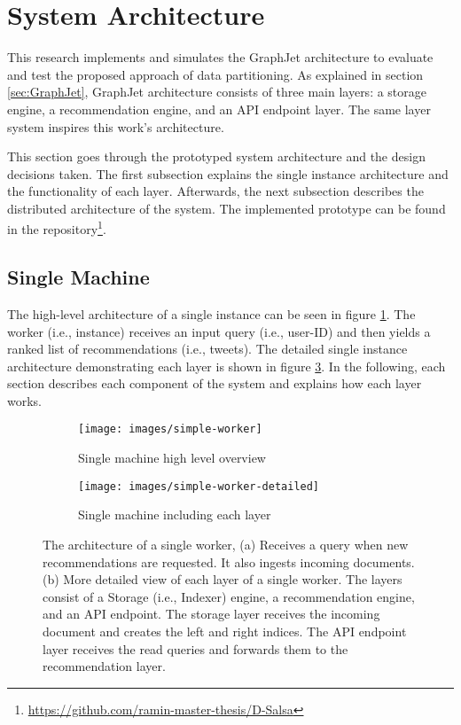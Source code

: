 \section{System Architecture}
\label{sec:system-architecture}

This research implements and simulates the GraphJet architecture to evaluate and test the proposed approach of data partitioning. As explained in section \ref{sec:GraphJet}, GraphJet architecture consists of three main layers: a storage engine, a recommendation engine, and an API endpoint layer. The same layer system inspires this work's architecture. 


This section goes through the prototyped system architecture and the design decisions taken. The first subsection explains the single instance architecture and the functionality of each layer. Afterwards, the next subsection describes the distributed architecture of the system. The implemented prototype can be found in the repository\footnote{\url{https://github.com/ramin-master-thesis/D-Salsa}}.


\subsection{Single Machine}
\label{subsec:single-machine}
The high-level architecture of a single instance can be seen in figure \ref{fig:single-machine-architecture}. The worker (i.e., instance) receives an input query (i.e., user-ID) and then yields a ranked list of recommendations (i.e., tweets). The detailed single instance architecture demonstrating each layer is shown in figure \ref{fig:single-machine-architecture-detailed}. In the following, each section describes each component of the system and explains how each layer works.

\begin{figure}[!htb]
    \centering
    \begin{subfigure}[b]{0.75\textwidth}
       \texttt{[image: images/simple-worker]}
       \caption{Single machine high level overview}
       \label{fig:single-machine-architecture} 
    \end{subfigure}
    
    \begin{subfigure}[b]{0.8\textwidth}
       \texttt{[image: images/simple-worker-detailed]}
       \caption{Single machine including each layer}
       \label{fig:single-machine-architecture-detailed}
    \end{subfigure}
    
    \caption {The architecture of a single worker, (a) Receives a query when new recommendations are requested. It also ingests incoming documents. (b) More detailed view of each layer of a single worker. The layers consist of a Storage (i.e., Indexer) engine, a recommendation engine, and an API endpoint. The storage layer receives the incoming document and creates the left and right indices. The API endpoint layer receives the read queries and forwards them to the recommendation layer.}
\end{figure}


